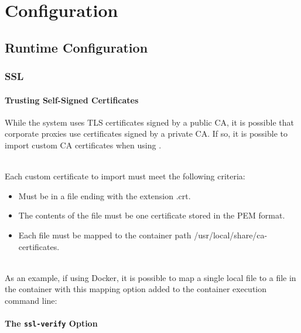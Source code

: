 \chapter{Configuration}


\section{Runtime Configuration}\label{sec:runtime-config}

\subsection{SSL}

\subsubsection{Trusting Self-Signed Certificates}\label{sec:self-signed-certs}

While the \cxone system uses TLS certificates signed by a public CA, it is possible that
corporate proxies use certificates signed by a private CA. If so, it is possible to
import custom CA certificates when using \cxoneflow.

\noindent\\Each custom certificate to import must meet the following criteria:

\begin{itemize}
    \item Must be in a file ending with the extension .crt.
    \item The contents of the file must be one certificate stored in the PEM format.
    \item Each file must be mapped to the container path /usr/local/share/ca-certificates.
\end{itemize}


\noindent\\As an example, if using Docker, it is possible to map a single local file to a file in the container with this mapping 
option added to the container execution command line:


\subsubsection{The \texttt{ssl-verify} Option}\label{sec:ssl-verify-general}

